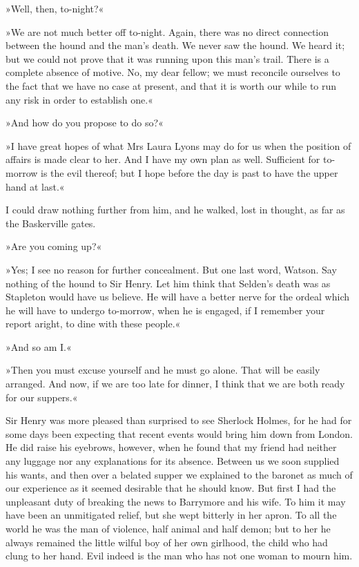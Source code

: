 »Well, then, to-night?«

»We are not much better off to-night. Again, there was no direct connection between the hound and the man's death. We never saw the hound. We heard it; but we could not prove that it was running upon this man's trail. There is a complete absence of motive. No, my dear fellow; we must reconcile ourselves to the fact that we have no case at present, and that it is worth our while to run any risk in order to establish one.«

»And how do you propose to do so?«

»I have great hopes of what Mrs Laura Lyons may do for us when the position of affairs is made clear to her. And I have my own plan as well. Sufficient for to-morrow is the evil thereof; but I hope before the day is past to have the upper hand at last.«

I could draw nothing further from him, and he walked, lost in thought, as far as the Baskerville gates.

»Are you coming up?«

»Yes; I see no reason for further concealment. But one last word, Watson. Say nothing of the hound to Sir Henry. Let him think that Selden's death was as Stapleton would have us believe. He will have a better nerve for the ordeal which he will have to undergo to-morrow, when he is engaged, if I remember your report aright, to dine with these people.«

»And so am I.«

»Then you must excuse yourself and he must go alone. That will be easily arranged. And now, if we are too late for dinner, I think that we are both ready for our suppers.«

Sir Henry was more pleased than surprised to see Sherlock Holmes, for he had for some days been expecting that recent events would bring him down from London. He did raise his eyebrows, however, when he found that my friend had neither any luggage nor any explanations for its absence. Between us we soon supplied his wants, and then over a belated supper we explained to the baronet as much of our experience as it seemed desirable that he should know. But first I had the unpleasant duty of breaking the news to Barrymore and his wife. To him it may have been an unmitigated relief, but she wept bitterly in her apron. To all the world he was the man of violence, half animal and half demon; but to her he always remained the little wilful boy of her own girlhood, the child who had clung to her hand. Evil indeed is the man who has not one woman to mourn him.

